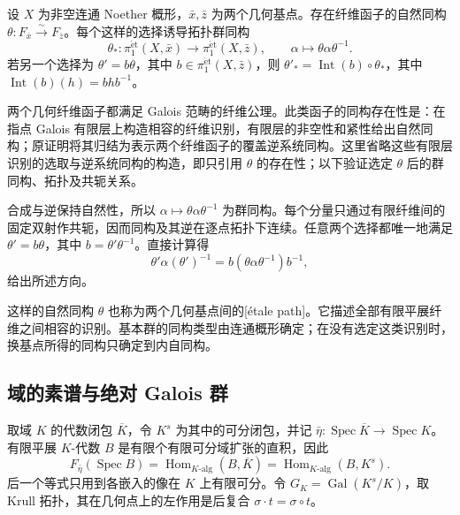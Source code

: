 \begin{proposition}\label{b3:prop:I-change-basepoint}
	设 \(X\) 为非空连通 Noether 概形，\(\bar x,\bar z\) 为两个几何基点。存在纤维函子的自然同构 \(\theta:F_{\bar x}\xrightarrow{\sim}F_{\bar z}\)。每个这样的选择诱导拓扑群同构
	\[
		\theta_*:\pi_1^{\mathrm{\acute et}}(X,\bar x)
		\longrightarrow\pi_1^{\mathrm{\acute et}}(X,\bar z),
		\qquad\alpha\longmapsto\theta\alpha\theta^{-1}.
	\]
	若另一个选择为 \(\theta'=b\theta\)，其中 \(b\in\pi_1^{\mathrm{\acute et}}(X,\bar z)\)，则 \(\theta'_* =\operatorname{Int}(b)\circ\theta_*\)，其中 \(\operatorname{Int}(b)(h)=bhb^{-1}\)。
\end{proposition}
\begin{proofsketch}
	两个几何纤维函子都满足 Galois 范畴的纤维公理。此类函子的同构存在性是\cite[Exposé V, Corollaire 5.7, p. 107]{SGA12003}：在指点 Galois 有限层上构造相容的纤维识别，有限层的非空性和紧性给出自然同构；原证明将其归结为表示两个纤维函子的覆盖逆系统同构。这里省略这些有限层识别的选取与逆系统同构的构造，即只引用 \(\theta\) 的存在性；以下验证选定 \(\theta\) 后的群同构、拓扑及共轭关系。

	合成与逆保持自然性，所以 \(\alpha\mapsto\theta\alpha\theta^{-1}\) 为群同构。每个分量只通过有限纤维间的固定双射作共轭，因而同构及其逆在逐点拓扑下连续。任意两个选择都唯一地满足 \(\theta'=b\theta\)，其中 \(b=\theta'\theta^{-1}\)。直接计算得
	\[
		\theta'\alpha(\theta')^{-1}
		=b(\theta\alpha\theta^{-1})b^{-1},
	\]
	给出所述方向。
\end{proofsketch}

这样的自然同构 \(\theta\) 也称为两个几何基点间的[étale path]。它描述全部有限平展纤维之间相容的识别。基本群的同构类型由连通概形确定；在没有选定这类识别时，换基点所得的同构只确定到内自同构。

\subsection{域的素谱与绝对 Galois 群}
\label{b3:subsec:I02:03}

取域 \(K\) 的代数闭包 \(\overline K\)，令 \(K^s\) 为其中的可分闭包，并记 \(\bar\eta:\operatorname{Spec}\overline K\rightarrow\operatorname{Spec}K\)。有限平展 \(K\)-代数 \(B\) 是有限个有限可分域扩张的直积，因此
\[
	F_{\bar\eta}(\operatorname{Spec}B)
	=\operatorname{Hom}_{K\text{-}\mathrm{alg}}(B,\overline K)
	=\operatorname{Hom}_{K\text{-}\mathrm{alg}}(B,K^s).
\]
后一个等式只用到各嵌入的像在 \(K\) 上有限可分。令 \(G_K=\operatorname{Gal}(K^s/K)\)，取 Krull 拓扑，其在几何点上的左作用是后复合 \(\sigma\cdot t=\sigma\circ t\)。

